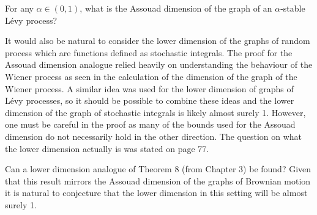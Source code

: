\begin{question}
For any $\alpha \in (0,1)$, what is the Assouad dimension of the graph of an $\alpha$-stable L\'evy process? 
\end{question}

It would also be natural to consider the lower dimension of the graphs of random process which are functions defined as stochastic integrals. The proof for the Assouad dimension analogue relied heavily on understanding the behaviour of the Wiener process as seen in the calculation of the dimension of the graph of the Wiener process. A similar idea was used for the lower dimension of graphs of L\'evy processes, so it should be possible to combine these ideas and the lower dimension of the graph of stochastic integrals is likely almost surely 1. However, one must be careful in the proof as many of the bounds used for the Assouad dimension do not necessarily hold in the other direction. The question on what the lower dimension actually is was stated on page 77.

\begin{question}
Can a lower dimension analogue of Theorem 8 (from Chapter 3) be found? Given that this result mirrors the Assouad dimension of the graphs of Brownian motion it is natural to conjecture that the lower dimension in this setting will be almost surely 1.
\end{question}

